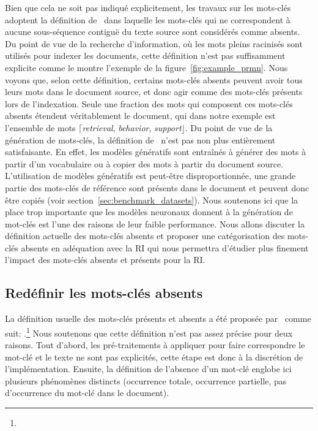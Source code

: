 Bien que cela ne soit pas indiqué explicitement, les travaux sur les mots-clés adoptent la définition de~\citet{meng_deep_2017} dans laquelle les mots-clés qui ne correspondent à aucune sous-séquence contiguë du texte source sont considérés comme absents.
Du point de vue de la recherche d'information, où les mots pleins racinisés sont utilisés pour indexer les documents, cette définition n'est pas suffisamment explicite comme le montre l'exemple de la figure~\ref{fig:example_prmn}.
Nous voyons que, selon cette définition, certains mots-clés absents peuvent avoir tous leurs mots dans le document source, et donc agir comme des mots-clés présents lors de l'indexation.
Seule une fraction des mots qui composent ces mots-clés absents étendent véritablement le document, qui dans notre exemple est l'ensemble de mots $\lceil$\emph{retrieval}, \emph{behavior}, \emph{support}$\rfloor$.
Du point de vue de la génération de mots-clés, la définition de~\citet{meng_deep_2017} n'est pas non plus entièrement satisfaisante.
En effet, les modèles génératifs sont entraînés à générer des mots à partir d'un vocabulaire ou à copier des mots à partir du document source.
L'utilisation de modèles génératifs est peut-être disproportionnée, une grande partie des mots-clés de référence sont présents dans le document et peuvent donc être copiés (voir section~\ref{sec:benchmark_datasets}).
Nous soutenons ici que la place trop importante que les modèles neuronaux donnent à la génération de mot-clés est l'une des raisons de leur faible performance. %
Nous allons discuter la définition actuelle des mots-clés absents et proposer une catégorisation des mots-clés absents en adéquation avec la RI qui nous permettra d'étudier plus finement l'impact des mots-clés absents et présents pour la RI.



\subsection{Redéfinir les mots-clés absents}
\label{sec:def}

La définition usuelle des mots-clés présents et absents a été proposée par~\citet{meng_deep_2017} comme suit:
.\footnote{}
Nous soutenons que cette définition n'est pas assez précise pour deux raisons.
Tout d'abord, les pré-traitements à appliquer pour faire correspondre le mot-clé et le texte ne sont pas explicités, cette étape est donc à la discrétion de l'implémentation.
Ensuite, la définition de l'absence d'un mot-clé englobe ici plusieurs phénomènes distincts (occurrence totale, occurrence partielle, pas d'occurrence du mot-clé dans le document).

